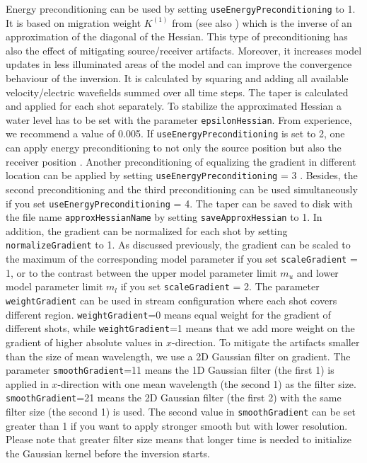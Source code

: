 \documentclass[pdftex,a4paper,parskip,listof=totoc,bibliography=totoc,onehalfspacing,12pt]{scrreprt}
\begin{document}
Energy preconditioning can be used by setting \verb+useEnergyPreconditioning+ to 1. It is based on migration weight $K^{(1)}$ from \cite{plessix2004frequency} (see also \cite{shin2001improved}) which is the inverse of an approximation of the diagonal of the Hessian. This type of preconditioning has also the effect of mitigating source/receiver artifacts. Moreover, it increases model updates in less illuminated areas of the model and can improve the convergence behaviour of the inversion. It is calculated by squaring and adding all available velocity/electric wavefields summed over all time steps. The taper is calculated and applied for each shot separately. To stabilize the approximated Hessian a water level has to be set with the parameter \verb+epsilonHessian+. From experience, we recommend a value of 0.005. If \verb+useEnergyPreconditioning+ is set to 2, one can apply energy preconditioning to not only the source position but also the receiver position \citep{kurzmann2013acoustic}. Another preconditioning of equalizing the gradient in different location can be applied by setting \verb+useEnergyPreconditioning+ = 3 \citep{nuber2015enhancement}. Besides, the second preconditioning and the third preconditioning can be used simultaneously if you set \verb+useEnergyPreconditioning+ = 4.
The taper can be saved to disk with the file name \verb+approxHessianName+ by setting \verb+saveApproxHessian+ to 1.
In addition, the gradient can be normalized for each shot by setting \verb+normalizeGradient+ to 1.
As discussed previously, the gradient can be scaled to the maximum of the corresponding model parameter if you set \verb+scaleGradient+ = 1, or to the contrast between the upper model parameter limit $m_u$ and lower model parameter limit $m_l$ if you set \verb+scaleGradient+ = 2. The parameter \verb+weightGradient+ can be used in stream configuration where each shot covers different region. \verb+weightGradient+=0 means equal weight for the gradient of different shots, while \verb+weightGradient+=1 means that we add more weight on the gradient of higher absolute values in $x$-direction. To mitigate the artifacts smaller than the size of mean wavelength, we use a 2D Gaussian filter on gradient. The parameter \verb+smoothGradient+=11 means the 1D Gaussian filter (the first 1) is applied in $x$-direction with one mean wavelength (the second 1) as the filter size. \verb+smoothGradient+=21 means the 2D Gaussian filter (the first 2) with the same filter size (the second 1) is used. The second value in \verb+smoothGradient+ can be set greater than 1 if you want to apply stronger smooth but with lower resolution. Please note that greater filter size means that longer time is needed to initialize the Gaussian kernel before the inversion starts.
\end{document}
